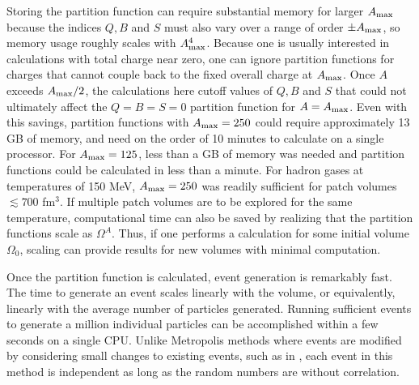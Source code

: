 Storing the partition function can require substantial memory for larger $A_{\rm max}$ because the indices $Q,B$ and $S$ must also vary over a range of order $\pm A_{\rm max}$, so memory usage roughly scales with $A_{\rm max}^4$. Because one is usually interested in calculations with total charge near zero, one can ignore partition functions for charges that cannot couple back to the fixed overall charge at $A_{\rm max}$. Once $A$ exceeds $A_{\rm max}/2$, the calculations here cutoff values of $Q,B$ and $S$ that could not ultimately affect the $Q=B=S=0$ partition function for $A=A_{\rm max}$. Even with this savings, partition functions with $A_{\rm max}=250$ could require approximately 13 GB of memory, and need on the order of 10 minutes to calculate on a single processor. For $A_{\rm max}=125$, less than a GB of memory was needed and partition functions could be calculated in less than a minute. For hadron gases at temperatures of 150 MeV, $A_{\rm max}=250$ was readily sufficient for patch volumes $\lesssim 700$ fm$^3$. If multiple patch volumes are to be explored for the same temperature, computational time can also be saved by realizing that the partition functions scale as $\Omega^A$. Thus, if one performs a calculation for some initial volume $\Omega_0$, scaling can provide results for new volumes with minimal computation.

Once the partition function is calculated, event generation is remarkably fast. The time to generate an event scales linearly with the volume, or equivalently, linearly with the average number of particles generated. Running sufficient events to generate a million individual particles can be accomplished within a few seconds on a single CPU. Unlike Metropolis methods where events are modified by considering small changes to existing events, such as in \cite{Oliinychenko:2020cmr}, each event in this method is independent as long as the random numbers are without correlation.
